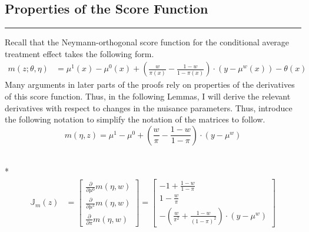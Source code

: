 \subsection{Properties of the Score Function}
\hrule

Recall that the Neymann-orthogonal score function for the conditional average treatment effect takes the following form.
\begin{equation}
    \begin{aligned}
        m\left(z; \theta, \eta\right)
		& = \mu^{1}\left(x\right) - \mu^{0}\left(x\right) 
        + \left(\frac{w}{\pi\left(x\right)} - \frac{1 - w}{1 - \pi\left(x\right)}\right) \cdot \left(y - \mu^{w}\left(x\right)\right) -  \theta\left(x\right)
	\end{aligned}
\end{equation}
Many arguments in later parts of the proofs rely on properties of the derivatives of this score function.
Thus, in the following Lemmas, I will derive the relevant derivatives with respect to changes in the nuisance parameters.
Thus, introduce the following notation to simplify the notation of the matrices to follow.
\begin{equation}
    m\left(\eta, z\right) = \mu^{1} - \mu^{0} + \left(\frac{w}{\pi} - \frac{1 - w}{1 - \pi}\right) \cdot \left(y - \mu^{w}\right)
\end{equation}

\begin{lem}\label{lem:score_jacobian}\mbox{}\\*
    \begin{equation}
        \begin{aligned}
            \mathbb{J}_{m}(z)
            & = \begin{bmatrix}
                \frac{\partial}{\partial \mu^{0}} m\left(\eta, w\right)\\
                \frac{\partial}{\partial \mu^{1}} m\left(\eta, w\right)\\
                \frac{\partial}{\partial \pi} m\left(\eta, w\right)
            \end{bmatrix} 
            = \begin{bmatrix}
                -1 + \frac{1 - w}{1 - \pi} \\
                1 - \frac{w}{\pi} \\
                -\left(\frac{w}{\pi^2} + \frac{1-w}{\left(1-\pi\right)^{2}}\right)  \cdot \left(y - \mu^{w}\right)
            \end{bmatrix} 
        \end{aligned}
    \end{equation}
\end{lem}

